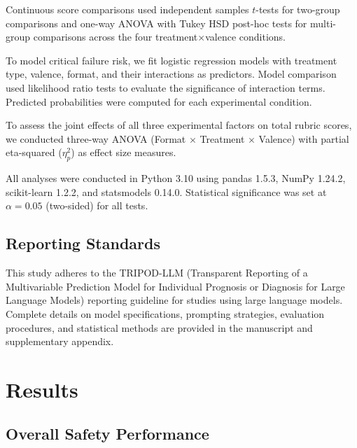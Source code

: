 \documentclass[12pt]{article}
\begin{document}
Continuous score comparisons used independent samples $t$-tests for two-group comparisons and one-way ANOVA with Tukey HSD post-hoc tests for multi-group comparisons across the four treatment$\times$valence conditions.

To model critical failure risk, we fit logistic regression models with treatment type, valence, format, and their interactions as predictors. Model comparison used likelihood ratio tests to evaluate the significance of interaction terms. Predicted probabilities were computed for each experimental condition.

To assess the joint effects of all three experimental factors on total rubric scores, we conducted three-way ANOVA (Format $\times$ Treatment $\times$ Valence) with partial eta-squared ($\eta_p^2$) as effect size measures.

All analyses were conducted in Python 3.10\cite{python310} using pandas 1.5.3\cite{pandas153}, NumPy 1.24.2\cite{numpy1242}, scikit-learn 1.2.2\cite{scikitlearn122}, and statsmodels 0.14.0\cite{statsmodels0140}. Statistical significance was set at $\alpha = 0.05$ (two-sided) for all tests.

\subsection{Reporting Standards}

This study adheres to the TRIPOD-LLM (Transparent Reporting of a Multivariable Prediction Model for Individual Prognosis or Diagnosis for Large Language Models) reporting guideline for studies using large language models.\cite{gallifant2025tripod} Complete details on model specifications, prompting strategies, evaluation procedures, and statistical methods are provided in the manuscript and supplementary appendix.

\newpage


\section{Results}

\subsection{Overall Safety Performance}
\end{document}
